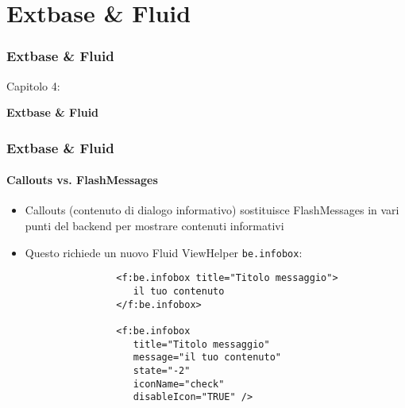 %

\section{Extbase \& Fluid}
\begin{frame}[fragile]
	\frametitle{Extbase \& Fluid}

	\begin{center}\huge{Capitolo 4:}\end{center}
	\begin{center}\huge{\color{typo3darkgrey}\textbf{Extbase \& Fluid}}\end{center}

\end{frame}


\begin{frame}[fragile]
	\frametitle{Extbase \& Fluid}
	\framesubtitle{Callouts vs. FlashMessages}

	\begin{itemize}

		\item Callouts (contenuto di dialogo informativo) sostituisce FlashMessages in vari punti
			del backend per mostrare contenuti informativi

		\item Questo richiede un nuovo Fluid ViewHelper \texttt{be.infobox}:

			\begin{lstlisting}
				<f:be.infobox title="Titolo messaggio">
				   il tuo contenuto
				</f:be.infobox>

				<f:be.infobox
				   title="Titolo messaggio"
				   message="il tuo contenuto"
				   state="-2"
				   iconName="check"
				   disableIcon="TRUE" />
			\end{lstlisting}

	\end{itemize}

\end{frame}

